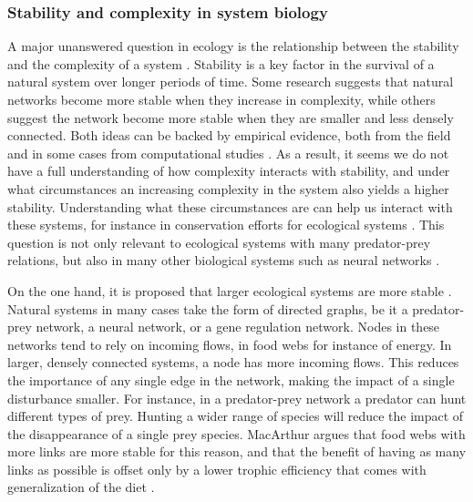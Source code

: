 \documentclass[../main.tex]{subfiles}
\begin{document}
\subsubsection{Stability and complexity in system biology}

A major unanswered question in ecology is the relationship between the stability and the complexity of a system \cite{kondoh2003foraging, macarthur1955fluctuations, pimm1977number}.
Stability is a key factor in the survival of a natural system over longer periods of time.
Some research suggests that natural networks become more stable when they increase in complexity, while others suggest the network become more stable when they are smaller and less densely connected.
Both ideas can be backed by empirical evidence, both from the field and in some cases from computational studies \cite{chen2001global, kondoh2003foraging}.
As a result, it seems we do not have a full understanding of how complexity interacts with stability, and under what circumstances an increasing complexity in the system also yields a higher stability.
Understanding what these circumstances are can help us interact with these systems, for instance in conservation efforts for ecological systems \cite{kondoh2003foraging}.
This question is not only relevant to ecological systems with many predator-prey relations, but also in many other biological systems such as neural networks \cite{tononi1999measures}.

On the one hand, it is proposed that larger ecological systems are more stable \cite{macarthur1955fluctuations}.
Natural systems in many cases take the form of directed graphs, be it a predator-prey network, a neural network, or a gene regulation network.
Nodes in these networks tend to rely on incoming flows, in food webs for instance of energy.
In larger, densely connected systems, a node has more incoming flows.
This reduces the importance of any single edge in the network, making the impact of a single disturbance smaller.
For instance, in a predator-prey network a predator can hunt different types of prey.
Hunting a wider range of species will reduce the impact of the disappearance of a single prey species.
MacArthur argues that food webs with more links are more stable for this reason, and that the benefit of having as many links as possible is offset only by a lower trophic efficiency that comes with generalization of the diet \cite{macarthur1955fluctuations}.
\end{document}
